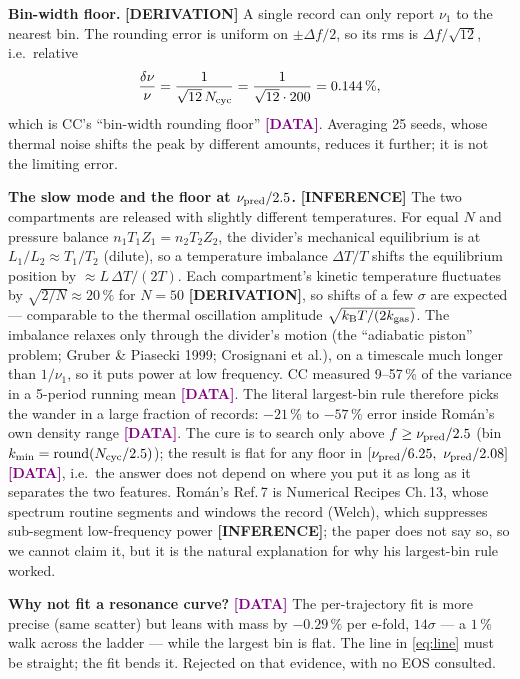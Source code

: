 \documentclass[11pt,a4paper]{article}
\newcommand{\kT}{k_{\mathrm B}T}
\newcommand{\der}{\textcolor{NavyBlue}{\textbf{[DERIVATION]}}}
\newcommand{\infr}{\textcolor{BurntOrange}{\textbf{[INFERENCE]}}}
\newcommand{\dat}{\textcolor{Purple}{\textbf{[DATA]}}}
\begin{document}
\textbf{Bin-width floor.} \der{} A single record can only report $\nu_1$ to the nearest bin. The rounding error is uniform on $\pm\Delta f/2$, so its rms is $\Delta f/\sqrt{12}$, i.e.\ relative
\begin{equation}
\frac{\delta\nu}{\nu} = \frac{1}{\sqrt{12}\,N_{\rm cyc}} = \frac{1}{\sqrt{12}\cdot 200} = 0.144\,\% ,
\end{equation}
which is CC's ``bin-width rounding floor'' \dat{}. Averaging 25 seeds, whose thermal noise shifts the peak by different amounts, reduces it further; it is not the limiting error.

\textbf{The slow mode and the floor at $\nu_{\rm pred}/2.5$.} \infr{} The two compartments are released with slightly different temperatures. For equal $N$ and pressure balance $n_1 T_1 Z_1 = n_2 T_2 Z_2$, the divider's mechanical equilibrium is at $L_1/L_2 \approx T_1/T_2$ (dilute), so a temperature imbalance $\Delta T/T$ shifts the equilibrium position by $\approx L\,\Delta T/(2T)$. Each compartment's kinetic temperature fluctuates by $\sqrt{2/N}\approx 20\,\%$ for $N=50$ \der{}, so shifts of a few $\sigma$ are expected --- comparable to the thermal oscillation amplitude $\sqrt{\kT/(2k_{\rm gas})}$. The imbalance relaxes only through the divider's motion (the ``adiabatic piston'' problem; Gruber \& Piasecki 1999; Crosignani et al.), on a timescale much longer than $1/\nu_1$, so it puts power at low frequency. CC measured 9--57\,\% of the variance in a 5-period running mean \dat{}. The literal largest-bin rule therefore picks the wander in a large fraction of records: $-21\,\%$ to $-57\,\%$ error inside Rom\'an's own density range \dat{}. The cure is to search only above $f \ge \nu_{\rm pred}/2.5$ (bin $k_{\min} = \mathrm{round}(N_{\rm cyc}/2.5)$); the result is flat for any floor in $[\nu_{\rm pred}/6.25,\ \nu_{\rm pred}/2.08]$ \dat{}, i.e.\ the answer does not depend on where you put it as long as it separates the two features. Rom\'an's Ref.\,7 is Numerical Recipes Ch.\,13, whose spectrum routine segments and windows the record (Welch), which suppresses sub-segment low-frequency power \infr{}; the paper does not say so, so we cannot claim it, but it is the natural explanation for why his largest-bin rule worked.

\textbf{Why not fit a resonance curve?} \dat{} The per-trajectory fit is more precise (same scatter) but leans with mass by $-0.29\,\%$ per e-fold, $14\sigma$ --- a $1\,\%$ walk across the ladder --- while the largest bin is flat. The line in \eqref{eq:line} must be straight; the fit bends it. Rejected on that evidence, with no EOS consulted.
\end{document}
